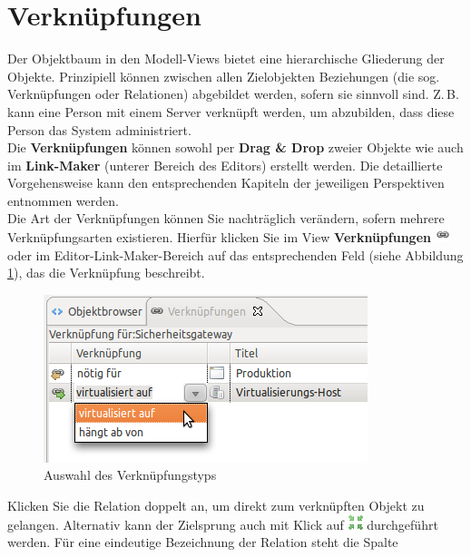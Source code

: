 \documentclass[a4paper,10pt]{book}
\begin{document}
\section{Verknüpfungen}
Der Objektbaum in den Modell-Views bietet eine hierarchische Gliederung der
Objekte. Prinzipiell können zwischen allen Zielobjekten Beziehungen (die sog.
Verknüpfungen oder Relationen) abgebildet werden, sofern sie sinnvoll sind.
Z.\,B. kann eine Person mit einem Server verknüpft werden, um abzubilden, dass
diese Person das System administriert.
\newline\\
Die \textbf{Verknüpfungen} können sowohl per \textbf{Drag \& Drop}
zweier Objekte wie auch im \textbf{Link-Maker} (unterer Bereich des
Editors) erstellt werden.  Die detaillierte Vorgehensweise kann den
entsprechenden Kapiteln der jeweiligen Perspektiven entnommen werden.
\newline\\
Die Art der Verknüpfungen können Sie nachträglich verändern, sofern
mehrere Verknüpfungsarten existieren. Hierfür klicken Sie im View
\textbf{Verknüpfungen} \includegraphics[height=2ex]{Icon/Relationen.png}
oder im Editor-Link-Maker-Bereich auf das entsprechenden Feld (siehe
Abbildung \ref{Auswahl des Verknuepfungstyps}), das die Verknüpfung
beschreibt.  \newline
\begin{figure}[htb!]
  \centering
  \includegraphics[scale=.7]{Screenshot/Verknue.png}
  \caption{\label{Auswahl des Verknuepfungstyps} Auswahl des Verknüpfungstyps}
\end{figure}
\newline
Klicken Sie die Relation doppelt an, um direkt zum verknüpften Objekt zu gelangen. Alternativ kann der Zielsprung auch mit
Klick auf \includegraphics[height=2ex]{Icon/Ziel.png} durchgeführt werden. Für eine eindeutige Bezeichnung der Relation steht die Spalte
\end{document}
